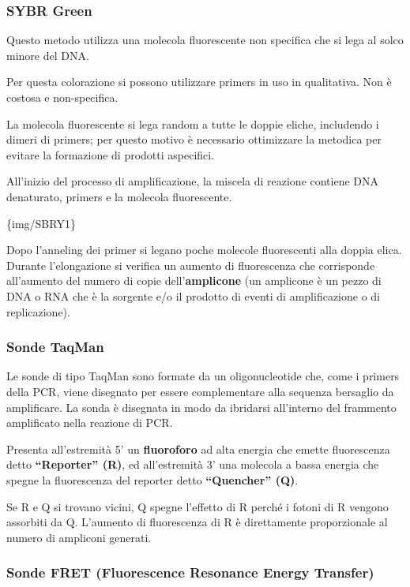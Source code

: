 \documentclass[11pt]{book}
\begin{document}
\subsubsection{SYBR Green}\label{sybr-green}

Questo metodo utilizza una molecola fluorescente non specifica che si
lega al solco minore del DNA.

Per questa colorazione si possono utilizzare primers in uso in
qualitativa. Non è costosa e non-specifica.

La molecola fluorescente si lega random a tutte le doppie eliche,
includendo i dimeri di primers; per questo motivo è necessario
ottimizzare la metodica per evitare la formazione di prodotti
aspecifici.

All'inizio del processo di amplificazione, la miscela di reazione
contiene DNA denaturato, primers e la molecola fluorescente.

\{img/SBRY1\}

Dopo l'anneling dei primer si legano poche molecole fluorescenti alla
doppia elica. Durante l'elongazione si verifica un aumento di fluorescenza
che corrisponde all'aumento del numero di copie dell'\textbf{amplicone}
(un amplicone è un pezzo di DNA o RNA che è la sorgente e/o il prodotto
di eventi di amplificazione o di replicazione).

\subsubsection{Sonde TaqMan}\label{sonde-taqman}

Le sonde di tipo TaqMan sono formate da un oligonucleotide che, come i
primers della PCR, viene disegnato per essere complementare alla
sequenza bersaglio da amplificare. La sonda è disegnata in modo da
ibridarsi all'interno del frammento amplificato nella reazione di PCR.

Presenta all'estremità 5' un \textbf{fluoroforo} ad alta energia che
emette fluorescenza detto \textbf{``Reporter'' (R)}, ed all'estremità 3'
una molecola a bassa energia che spegne la fluorescenza del reporter
detto \textbf{``Quencher'' (Q)}.

Se R e Q si trovano vicini, Q spegne l'effetto di R perché i fotoni di R
vengono assorbiti da Q. L'aumento di fluorescenza di R è direttamente
proporzionale al numero di ampliconi generati.

\subsubsection{Sonde FRET (Fluorescence Resonance Energy
Transfer)}\label{sonde-fret-fluorescence-resonance-energy-transfer}
\end{document}
